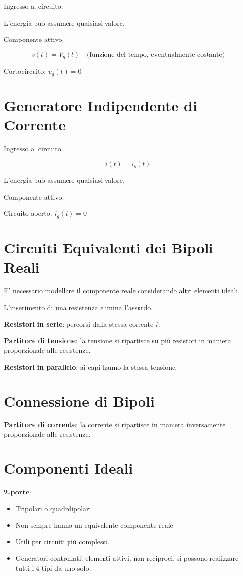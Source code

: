 Ingresso al circuito.

L'energia può assumere qualsiasi valore.

Componente attivo.

\[
v(t) = V_g(t) \quad \text{(funzione del tempo, eventualmente costante)}
\]

Cortocircuito: $v_g(t) = 0$

\section*{Generatore Indipendente di Corrente}

Ingresso al circuito.

\[
i(t) = i_g(t)
\]

L'energia può assumere qualsiasi valore.

Componente attivo.

Circuito aperto: $i_g(t) = 0$

\section*{Circuiti Equivalenti dei Bipoli Reali}

E' necessario modellare il componente reale considerando altri elementi ideali.

L'inserimento di una resistenza elimina l'assurdo.

\textbf{Resistori in serie}: percorsi dalla stessa corrente $i$.

\textbf{Partitore di tensione}: la tensione si ripartisce su più resistori in maniera proporzionale alle resistenze.

\textbf{Resistori in parallelo}: ai capi hanno la stessa tensione.

\section*{Connessione di Bipoli}

\textbf{Partitore di corrente}: la corrente si ripartisce in maniera inversamente proporzionale alle resistenze.

\section*{Componenti Ideali}

\textbf{2-porte}:

\begin{itemize}
    \item Tripolari o quadrdipolari.
    \item Non sempre hanno un equivalente componente reale.
    \item Utili per circuiti più complessi.
    \item Generatori controllati: elementi attivi, non reciproci, si possono realizzare tutti i 4 tipi da uno solo.
\end{itemize}


